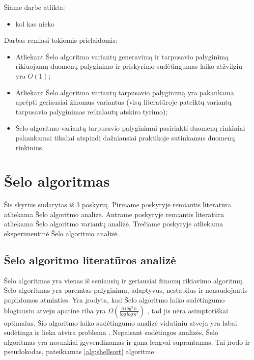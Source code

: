 \documentclass{VUMIFInfBakalaurinis}
\begin{document}
Šiame darbe atlikta:
\begin{itemize}
    \item kol kas nieko
\end{itemize}

\medskip

Darbas remiasi tokiomis prielaidomis:
\begin{itemize}
    \item Atliekant Šelo algoritmo variantų generavimą ir tarpusavio palyginimą rikiuojamų duomenų palyginimo ir priskyrimo sudėtingumas laiko atžvilgiu yra $O(1)$;
    \item Atliekant Šelo algoritmo variantų tarpusavio palyginimą yra pakankama aprėpti geriausiai žinomus variantus
        (visų literatūroje pateiktų variantų tarpusavio palyginimas reikalautų atskiro tyrimo);
    \item Šelo algoritmo variantų tarpusavio palyginimui pasirinkti duomenų rinkiniai pakankamai tiksliai atspindi dažniausiai praktikoje sutinkamus duomenų rinkinius.
\end{itemize}


\section{Šelo algoritmas}

Šis skyrius sudarytas iš 3 poskyrių.
Pirmame poskyryje remiantis literatūra atliekama Šelo algoritmo analizė.
Antrame poskyryje remiantis literatūra atliekama Šelo algoritmo variantų analizė.
Trečiame poskyryje atliekama eksperimentinė Šelo algoritmo analizė.

\subsection{Šelo algoritmo literatūros analizė}


Šelo algoritmas yra vienas iš seniausių ir geriausiai žinomų rikiavimo algoritmų.
Šelo algoritmas yra paremtas palyginimu, adaptyvus, nestabilus ir nenaudojantis papildomos atminties.
Yra įrodyta, kad Šelo algoritmo laiko sudėtingumo blogiausiu atveju apatinė riba yra
$\Omega(\frac{n\,log^2\,n}{log\,log\,n^2})$ \cite{plaxton1992}, tad jis nėra asimptotiškai optimalus.
Šio algoritmo laiko sudėtingumo analizė vidutiniu atveju yra labai sudėtinga
ir lieka atvira problema \cite{ciura2001best,Radavičius_Baranauskas_2013}.
Nepaisant sudėtingos analizės, Šelo algoritmas yra nesunkiai įgyvendinamas ir gana lengvai suprantamas.
Tai įrodo ir pseudokodas, pateikiamas \ref{alg:shellsort} algoritme.
\end{document}
